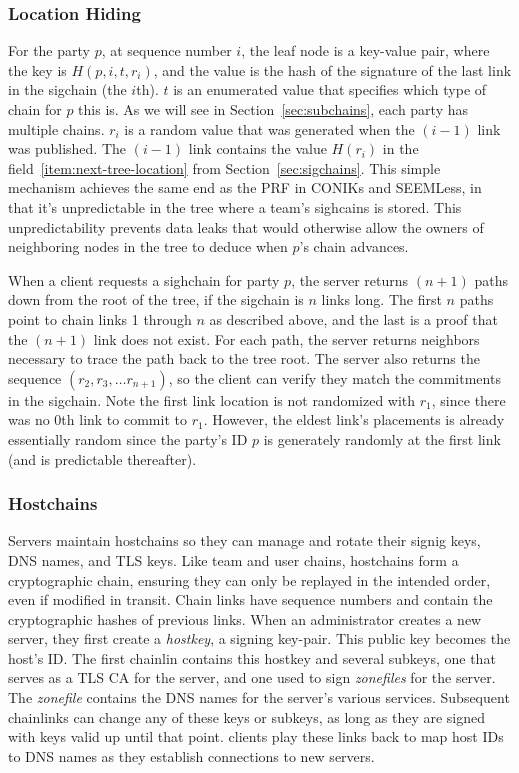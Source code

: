 \subsubsection{Location Hiding}
\label{sec:location-hiding}

For the party $p$, at sequence number $i$, the leaf node is a key-value pair,
where the key is $H(p,i,t,r_i)$, and the value is the hash of the signature of
the last link in the sigchain (the $i$th). $t$ is an enumerated value that
specifies which type of chain for $p$ this is. As we will see in 
Section~\ref{sec:subchains}, each party has multiple chains.  $r_i$ is a random
value that was generated when the $(i-1)$ link was published. The $(i-1)$ link
contains the value $H(r_i)$ in the field~\ref{item:next-tree-location} from
Section~\ref{sec:sigchains}. This simple mechanism achieves the same end as the
PRF in CONIKs and SEEMLess, in that it's unpredictable in the tree where a
team's sighcains is stored. This unpredictability prevents data leaks that would
otherwise allow the owners of neighboring nodes in the tree to deduce when $p$'s
chain advances. 

When a client requests a sighchain for party $p$, the server returns $(n+1)$
paths down from the root of the tree, if the sigchain is $n$ links long. The
first $n$ paths point to chain links 1 through $n$ as described above, and the
last is a proof that the $(n+1)$ link does not exist. For each path, the server
returns neighbors necessary to trace the path back to the tree root. The server
also returns the sequence $(r_2, r_3, \dots r_{n+1})$, so the client can verify
they match the commitments in the sigchain.  Note the first link location is not
randomized with $r_1$, since there was no $0$th link to commit to $r_1$.
However, the eldest link's placements is already essentially random since the
party's ID $p$ is generately randomly at the first link (and is predictable
thereafter).


\subsubsection{Hostchains}
\label{sec:hostchains}

Servers maintain hostchains so they can manage and rotate their signig keys, DNS names,
and TLS keys. Like team and user chains, hostchains form a cryptographic chain, ensuring
they can only be replayed in the intended order, even if modified in transit. Chain links
have sequence numbers and contain the cryptographic hashes of previous links. When an
administrator creates a new server, they first create a \textit{hostkey}, a signing key-pair.
This public key becomes the host's ID. The first chainlin contains this hostkey and several
subkeys, one that serves as a TLS CA for the server, and one used to sign \textit{zonefiles}
for the server. The \textit{zonefile} contains the DNS names for the server's various services.
Subsequent chainlinks can change any of these keys
or subkeys, as long as they are signed with keys valid up until that point. clients
play these links back to map host IDs to DNS names as they establish connections
to new servers. 


